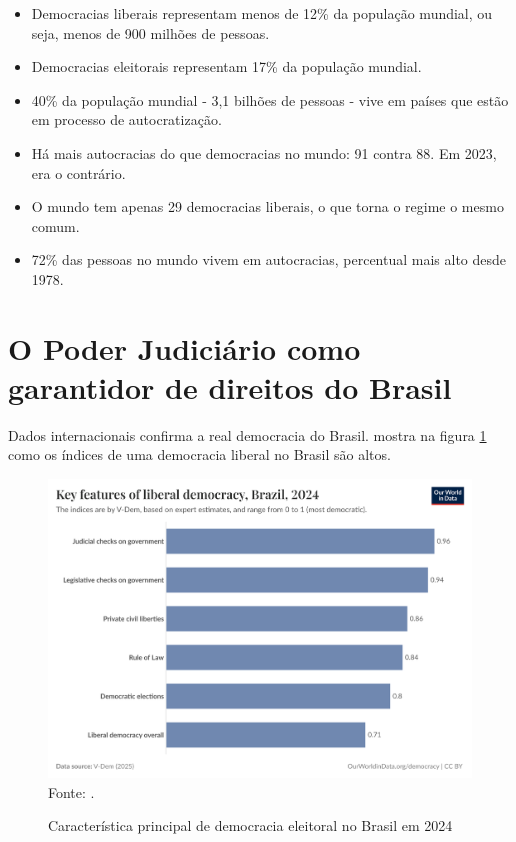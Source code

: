 \begin{itemize}
    \item Democracias liberais representam menos de 12\% da população mundial, ou seja, menos de 900 milhões de pessoas.
    \item Democracias eleitorais representam 17\% da população mundial.
    \item 40\%  da população mundial - 3,1 bilhões de pessoas - vive em países que estão em processo de autocratização.
    \item Há mais autocracias do que democracias no mundo: 91 contra 88. Em 2023, era o contrário.
    \item O mundo tem apenas 29 democracias liberais, o que torna o regime o mesmo comum.
    \item 72\% das pessoas no mundo vivem em autocracias, percentual mais alto desde 1978.
\end{itemize}

\section{O Poder Judiciário como garantidor de direitos do Brasil}

Dados internacionais confirma a real democracia do Brasil. \cite{rule-of-law-index} mostra na figura \ref{fig:key-features-of-liberal-democracy} como os índices de uma democracia liberal no Brasil são altos.

\begin{figure}[H]
	\centering
	\caption{Característica principal de democracia eleitoral no Brasil em 2024}
	\includegraphics[width=1\linewidth]{figuras/key-features-of-liberal-democracy}
	\label{fig:key-features-of-liberal-democracy}
	\footnotesize{Fonte: \cite{rule-of-law-index}.}
\end{figure}

